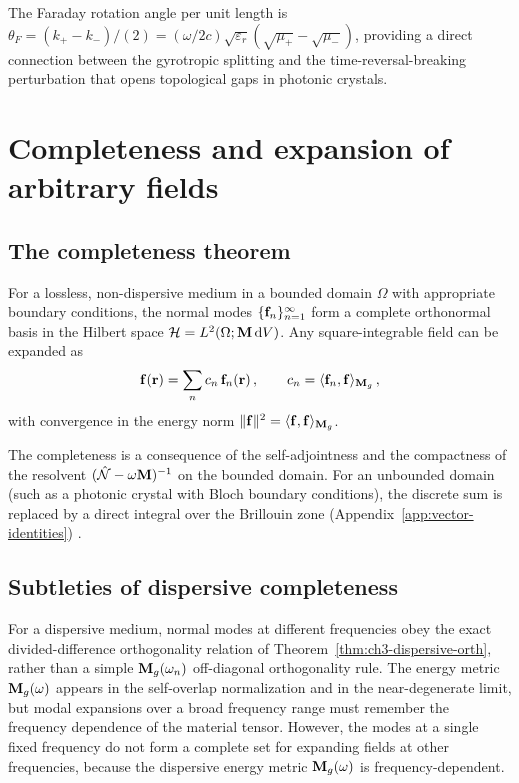 The Faraday rotation angle per unit length is
$\theta_F=(k_+-k_-)/(2)
=(\omega/2c)\sqrt{\varepsilon_r}(\sqrt{\mu_+}-\sqrt{\mu_-})$,
providing a direct connection between the gyrotropic splitting and the
time-reversal-breaking perturbation that opens topological gaps in
photonic crystals.

\section{Completeness and expansion of arbitrary fields}
\label{sec:ch3-completeness-expansion}

\subsection{The completeness theorem}
\label{sec:ch3-completeness-theorem}

For a lossless, non-dispersive medium in a bounded domain $\Omega$
with appropriate boundary conditions, the normal modes
$\{\mathbf{f}_n\}_{n=1}^\infty$ form a complete orthonormal basis in the
Hilbert space $\mathcal{H}=L^2(\Omega;\mathbf{M}\,\mathrm{d} V)$.  Any
square-integrable field can be expanded as
\begin{equation}\label{eq:ch3-completeness-expansion}
  \mathbf{f}(\mathbf{r}) = \sum_n c_n\,\mathbf{f}_n(\mathbf{r})\,,
  \qquad
  c_n = \langle \mathbf{f}_n , \mathbf{f} \rangle_{\mathbf{M}_g}\,,
\end{equation}
with convergence in the energy norm
$\|\mathbf{f}\|^2=\langle \mathbf{f} , \mathbf{f} \rangle_{\mathbf{M}_g}$.

The completeness is a consequence of the self-adjointness and the
compactness of the resolvent $(\hat{\mathcal{N}}-\omega\mathbf{M})^{-1}$ on the
bounded domain.  For an unbounded domain (such as a photonic crystal
with Bloch boundary conditions), the discrete sum is replaced by a
direct integral over the Brillouin zone
(Appendix~\ref{app:vector-identities})
\cite{silveirinha2016bulk,ozawa2018topological}.

\subsection{Subtleties of dispersive completeness}
\label{sec:ch3-dispersive-completeness}

For a dispersive medium, normal modes at different frequencies obey the
exact divided-difference orthogonality relation of
Theorem~\ref{thm:ch3-dispersive-orth}, rather than a simple
$\mathbf{M}_g(\omega_n)$ off-diagonal orthogonality rule.  The energy metric
$\mathbf{M}_g(\omega)$ appears in the self-overlap normalization and in the
near-degenerate limit, but modal expansions over a broad frequency range
must remember the frequency dependence of the material tensor.
However, the modes at a single fixed frequency do not form a complete
set for expanding fields at other frequencies, because the dispersive
energy metric $\mathbf{M}_g(\omega)$ is frequency-dependent.

